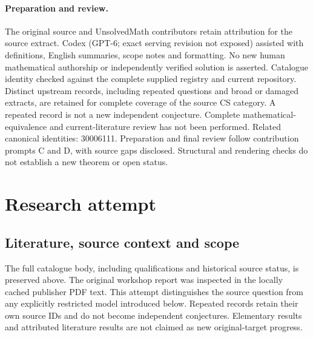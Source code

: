 \documentclass[11pt]{article}
\begin{document}
\paragraph{Preparation and review.}
The original source and UnsolvedMath contributors retain attribution for the source extract. Codex (GPT-6; exact serving revision not exposed) assisted with definitions, English summaries, scope notes and formatting. No new human mathematical authorship or independently verified solution is asserted. Catalogue identity checked against the complete supplied registry and current repository. Distinct upstream records, including repeated questions and broad or damaged extracts, are retained for complete coverage of the source CS category. A repeated record is not a new independent conjecture. Complete mathematical-equivalence and current-literature review has not been performed. Related canonical identities: 30006111. Preparation and final review follow contribution prompts C and D, with source gaps disclosed. Structural and rendering checks do not establish a new theorem or open status.
\label{end:statement}

\section{Research attempt}
\subsection{Literature, source context and scope}
The full catalogue body, including qualifications and historical source status, is preserved above. The original workshop report was inspected in the locally cached publisher PDF text. This attempt distinguishes the source question from any explicitly restricted model introduced below. Repeated records retain their own source IDs and do not become independent conjectures. Elementary results and attributed literature results are not claimed as new original-target progress.
\end{document}
